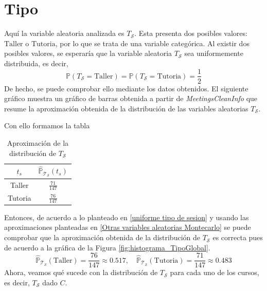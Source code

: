 \documentclass[11pt,a4paper]{book}
\theoremstyle{definition}%
\newcommand{\Probsymb}{\mathds{P}}
\newcommand{\Prob}[1]{\mathds{P}\left( #1 \right)}
\begin{document}
        \section{Tipo}
            Aquí la variable aleatoria analizada es $T_\mathcal{S}$. Esta presenta dos posibles valores: $\text{Taller}$ o $\text{Tutoria}$, por lo que se trata de una variable categórica. Al existir dos posibles valores, se esperaría que la variable aleatoria $T_\mathcal{S}$ sea uniformemente distribuida, es decir,
            \begin{equation}\label{uniforme tipo de sesion}
                \Prob{T_\mathcal{S}=\text{Taller}}=\Prob{T_\mathcal{S}=\text{Tutoria}}=\frac{1}{2}
            \end{equation}
            De hecho, se puede comprobar ello mediante los datos obtenidos. El siguiente gráfico muestra un gráfico de barras obtenida a partir de \textit{MeetingsCleanInfo} que resume la aproximación obtenida de la distribución de las variables aleatorias $T_\mathcal{S}$.

            Con ello formamos la tabla
            \begin{table}[H]
                \centering
                \begin{tabular}{|c|c|}
                    \hline
                    $t_s$ & $\hat{\Probsymb}_{\mathcal{T}_\mathcal{S}}(t_s)$ \\ \hline
                    Taller & $\frac{71}{147}$ \\ \hline
                    Tutoria & $\frac{76}{147}$ \\ \hline
                \end{tabular}
                \caption{Aproximación de la distribución de $T_\mathcal{S}$}
            \end{table}
            Entonces, de acuerdo a lo planteado en \ref{uniforme tipo de sesion} y usando las aproximaciones planteadas en \ref{Otras variables aleatorias Montecarlo} se puede comprobar que la aproximación obtenida de la distribución de $T_\mathcal{S}$ es correcta pues de acuerdo a la gráfica de la Figura \ref{fig:histograma_TipoGlobal}.
            \begin{equation}
                \hat{\Probsymb}_{\mathcal{T}_\mathcal{S}}(\text{Taller}) = \frac{76}{147} \approx 0.517, \quad \hat{\Probsymb}_{\mathcal{T}_\mathcal{S}}(\text{Tutoria}) = \frac{71}{147} \approx 0.483
            \end{equation}
            Ahora, veamos qué sucede con la distribución de $T_\mathcal{S}$ para cada uno de los cursos, es decir, $T_\mathcal{S}$ dado $C$.
\end{document}
